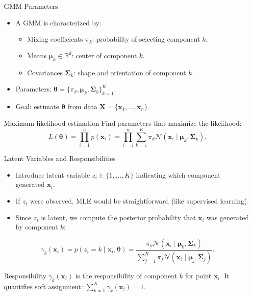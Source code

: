 \begin{frame}{GMM Parameters}
  \begin{itemize}
    \item A GMM is characterized by:
      \begin{itemize}
        \item \alert{Mixing coefficients} $\pi_k$: probability of selecting component $k$.
        \item \alert{Means} $\boldsymbol{\mu}_k \in \mathbb{R}^d$: center of component $k$.
        \item \alert{Covariances} $\boldsymbol{\Sigma}_k$: shape and orientation of
              component $k$.
      \end{itemize}
    \item Parameters: $\boldsymbol{\theta} = \{\pi_k, \boldsymbol{\mu}_k,
          \boldsymbol{\Sigma}_k\}_{k=1}^{K}$.
    \item Goal: estimate $\boldsymbol{\theta}$ from data $\mathbf{X} = \{\mathbf{x}_1,
          \ldots, \mathbf{x}_n\}$.
  \end{itemize}
  \begin{block}{Maximum likelihood estimation}
    Find parameters that maximize the likelihood:
    \[
    L(\boldsymbol{\theta}) = \prod_{i=1}^{n} p(\mathbf{x}_i) = \prod_{i=1}^{n}
                             \sum_{k=1}^{K} \pi_k \mathcal{N}(\mathbf{x}_i \mid
                             \boldsymbol{\mu}_k, \boldsymbol{\Sigma}_k).
    \]
  \end{block}
\end{frame}

\begin{frame}{Latent Variables and Responsibilities}
  \begin{itemize}
    \item Introduce latent variable $z_i \in \{1, \ldots, K\}$ indicating which component
          generated $\mathbf{x}_i$.
    \item If $z_i$ were observed, MLE would be straightforward (like supervised learning).
    \item Since $z_i$ is latent, we compute the \alert{posterior probability} that
          $\mathbf{x}_i$ was generated by component $k$:
  \end{itemize}
  \[
  \gamma_k(\mathbf{x}_i) = p(z_i=k \mid \mathbf{x}_i, \boldsymbol{\theta})
                         = \frac{\pi_k \mathcal{N}(\mathbf{x}_i \mid \boldsymbol{\mu}_k,
                                 \boldsymbol{\Sigma}_k)}{\sum_{j=1}^{K} \pi_j
                                 \mathcal{N}(\mathbf{x}_i \mid \boldsymbol{\mu}_j,
                                 \boldsymbol{\Sigma}_j)}.
  \]
  \begin{block}{Responsibility}
    $\gamma_k(\mathbf{x}_i)$ is the \alert{responsibility} of component $k$ for point
    $\mathbf{x}_i$. It quantifies soft assignment: $\sum_{k=1}^{K}\gamma_k(\mathbf{x}_i)=1$.
  \end{block}
\end{frame}

